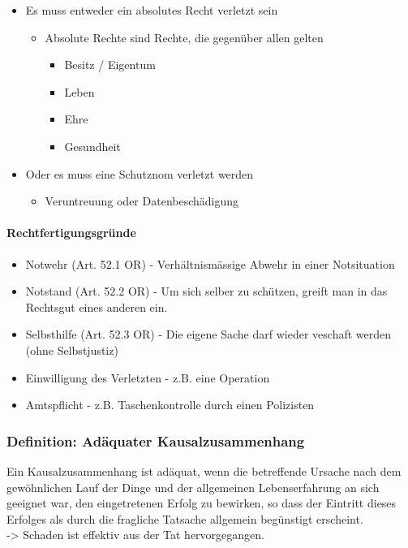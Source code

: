 \begin{itemize}
	\tightlist
	\item Es muss entweder ein absolutes Recht verletzt sein
	\begin{itemize}
		\tightlist
		\item Absolute Rechte sind Rechte, die gegenüber allen gelten
		\begin{itemize}
			\tightlist
			\item Besitz / Eigentum
			\item Leben
			\item Ehre
			\item Gesundheit
		\end{itemize}
	\end{itemize}
	\item Oder es muss eine Schutznom verletzt werden
	\begin{itemize}
		\tightlist
		\item Veruntreuung oder Datenbeschädigung
	\end{itemize}
\end{itemize}


\paragraph{Rechtfertigungsgründe}

\begin{itemize}
	\tightlist
	\item Notwehr (Art. 52.1 OR) - Verhältnismässige Abwehr in einer
	Notsituation
	\item Notstand (Art. 52.2 OR) - Um sich selber zu schützen, greift man in
	das Rechtsgut eines anderen ein.
	\item Selbsthilfe (Art. 52.3 OR) - Die eigene Sache darf wieder veschaft
	werden (ohne Selbstjustiz)
	\item Einwilligung des Verletzten - z.B. eine Operation
	\item Amtspflicht - z.B. Taschenkontrolle durch einen Polizisten
\end{itemize}

\subsubsection{Definition: Adäquater Kausalzusammenhang}

Ein Kausalzusammenhang ist adäquat, wenn die betreffende Ursache
nach dem gewöhnlichen Lauf der Dinge und der allgemeinen
Lebenserfahrung an sich geeignet war, den eingetretenen Erfolg zu
bewirken, so dass der Eintritt dieses Erfolges als durch die fragliche
Tatsache allgemein begünstigt erscheint.\\
-> Schaden ist effektiv aus der Tat hervorgegangen.


